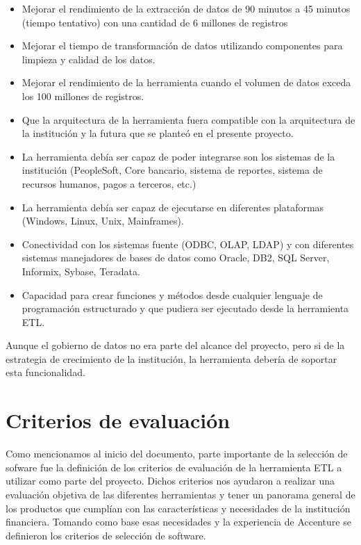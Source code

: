 \begin{itemize}

\item Mejorar el rendimiento de la extracción de datos de 90 minutos a 45
  minutos (tiempo tentativo) con una cantidad de 6 millones de registros

\item Mejorar el tiempo de transformación de datos utilizando componentes para
  limpieza y calidad de los datos.

\item Mejorar el rendimiento de la herramienta cuando el volumen de datos exceda
  los 100 millones de registros.

\item Que la arquitectura de la herramienta fuera compatible con la arquitectura
  de la institución y la futura que se planteó en el presente proyecto.

\item La herramienta debía ser capaz de poder integrarse son los sistemas de la
  institución (PeopleSoft, Core bancario, sistema de reportes, sistema de
  recursos humanos, pagos a terceros, etc.)

\item La herramienta debía ser capaz de ejecutarse en diferentes plataformas
  (Windows, Linux, Unix, Mainframes).

\item Conectividad con los sistemas fuente (ODBC, OLAP, LDAP) y con diferentes
  sistemas manejadores de bases de datos como Oracle, DB2, SQL Server, Informix,
  Sybase, Teradata.

\item Capacidad para crear funciones y métodos desde cualquier lenguaje de
  programación estructurado y que pudiera ser ejecutado desde la herramienta
  ETL.
\end{itemize}

Aunque el gobierno de datos no era parte del alcance del proyecto, pero si de la
estrategia de crecimiento de la institución, la herramienta debería de soportar
esta funcionalidad.

\section{Criterios de evaluación}

Como mencionamos al inicio del documento, parte importante de la selección de
sofware fue la definición de los criterios de evaluación de la herramienta ETL a
utilizar como parte del proyecto. Dichos criterios nos ayudaron a realizar una
evaluación objetiva de las diferentes herramientas y tener un panorama general
de los productos que cumplían con las características y necesidades de la
institución financiera. Tomando como base esas necesidades y la experiencia de
Accenture se definieron los criterios de selección de software.

